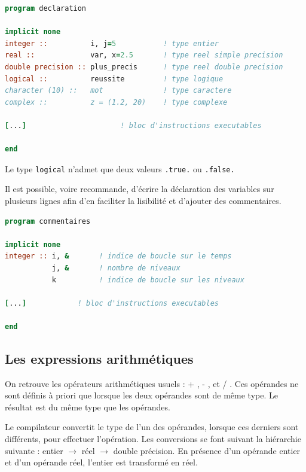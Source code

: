 \documentclass[a4paper,twoside]{article}
\begin{document}
\begin{exemple}
\begin{lstlisting}[language=Fortran]
program declaration
       
implicit none          
integer ::          i, j=5           ! type entier
real ::             var, x=2.5       ! type reel simple precision 
double precision :: plus_precis      ! type reel double precision 
logical ::          reussite         ! type logique 
character (10) ::   mot              ! type caractere
complex ::          z = (1.2, 20)    ! type complexe
   
[...]                      ! bloc d'instructions executables
      
end
\end{lstlisting}
\end{exemple}

Le type \texttt{logical} n'admet que deux valeurs \texttt{.true.} ou \texttt{.false.}

\begin{remarque}
Il est possible, voire recommande, d'écrire la déclaration des variables sur plusieurs lignes afin d'en faciliter la lisibilité et d'ajouter des commentaires.

\begin{lstlisting}[language=Fortran]
program commentaires 
 
implicit none
integer :: i, &       ! indice de boucle sur le temps
           j, &       ! nombre de niveaux  
           k          ! indice de boucle sur les niveaux 
    
[...]            ! bloc d'instructions executables
  
end
\end{lstlisting}
\end{remarque}

\subsection{Les expressions arithmétiques}
On retrouve les opérateurs arithmétiques usuels : \og + \fg, \og - \fg, \og * \fg et \og / \fg. Ces opérandes ne sont définis à priori que lorsque les deux opérandes sont de même type. Le résultat est du même type que les opérandes. 

Le compilateur convertit le type de l'un des opérandes, lorsque ces derniers sont différents, pour effectuer l'opération. Les conversions se font suivant la hiérarchie suivante : entier $\rightarrow$ réel $\rightarrow$ double précision. En présence d'un opérande entier et d'un opérande réel, l'entier est transformé en réel. 
\end{document}
